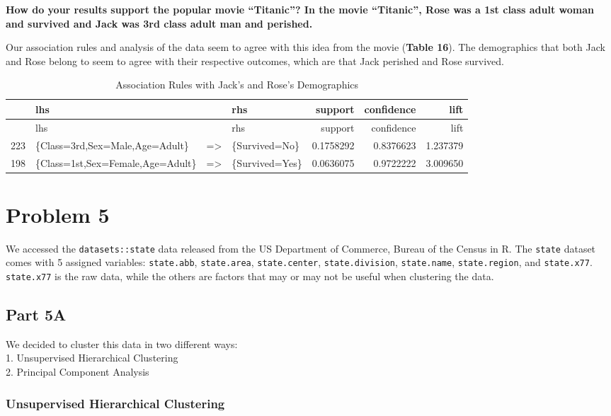 \documentclass[]{article}
\begin{document}
\textbf{How do your results support the popular movie ``Titanic''? In
the movie ``Titanic'', Rose was a 1st class adult woman and survived and
Jack was 3rd class adult man and perished.}

Our association rules and analysis of the data seem to agree with this
idea from the movie (\textbf{Table 16}). The demographics that both Jack
and Rose belong to seem to agree with their respective outcomes, which
are that Jack perished and Rose survived.

\begin{longtable}[c]{@{}llllrrr@{}}
\caption{Association Rules with Jack's and Rose's
Demographics}\tabularnewline
\toprule
& lhs & & rhs & support & confidence & lift\tabularnewline
\midrule
\endfirsthead
\toprule
& lhs & & rhs & support & confidence & lift\tabularnewline
\midrule
\endhead
223 & \{Class=3rd,Sex=Male,Age=Adult\} & =\textgreater{} &
\{Survived=No\} & 0.1758292 & 0.8376623 & 1.237379\tabularnewline
198 & \{Class=1st,Sex=Female,Age=Adult\} & =\textgreater{} &
\{Survived=Yes\} & 0.0636075 & 0.9722222 & 3.009650\tabularnewline
\bottomrule
\end{longtable}

\newpage 

\section{Problem 5}\label{problem-5}

We accessed the \texttt{datasets::state} data released from the US
Department of Commerce, Bureau of the Census in R. The \texttt{state}
dataset comes with 5 assigned variables: \texttt{state.abb},
\texttt{state.area}, \texttt{state.center}, \texttt{state.division},
\texttt{state.name}, \texttt{state.region}, and \texttt{state.x77}.
\texttt{state.x77} is the raw data, while the others are factors that
may or may not be useful when clustering the data.

\subsection{Part 5A}\label{part-5a}

We decided to cluster this data in two different ways:\\1. Unsupervised
Hierarchical Clustering\\2. Principal Component Analysis

\subsubsection{Unsupervised Hierarchical
Clustering}\label{unsupervised-hierarchical-clustering}
\end{document}
